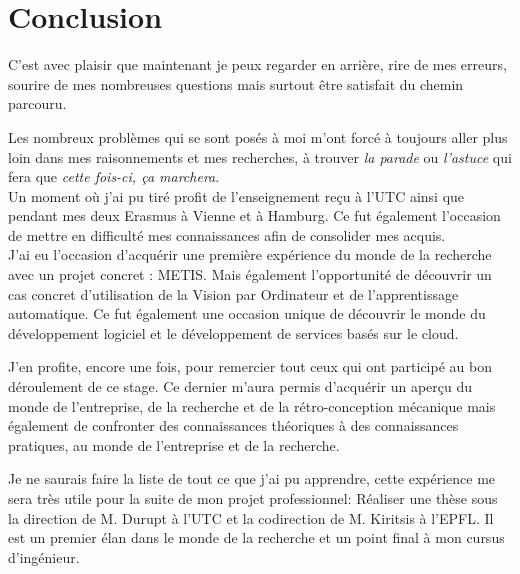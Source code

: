 \chapter{Conclusion}

C'est avec plaisir que maintenant je peux regarder en arrière, rire de mes erreurs, sourire de mes nombreuses questions mais surtout être satisfait du chemin parcouru.

Les nombreux problèmes qui se sont posés à moi m'ont forcé à toujours aller plus loin dans mes raisonnements et mes recherches, à trouver \textit{la parade} ou \textit{l'astuce} qui fera que \textit{cette fois-ci, ça marchera}.\\

Un moment où j'ai pu tiré profit de l'enseignement reçu à l'UTC ainsi que pendant mes deux Erasmus à Vienne et à Hamburg. Ce fut également l'occasion de mettre en difficulté mes connaissances afin de consolider mes acquis.\\

J'ai eu l'occasion d'acquérir une première expérience du monde de la recherche avec un projet concret : METIS. Mais également l'opportunité de découvrir un cas concret d'utilisation de la Vision par Ordinateur et de l'apprentissage automatique. Ce fut également une occasion unique de découvrir le monde du développement logiciel et le développement de services basés sur le cloud.

J'en profite, encore une fois, pour remercier tout ceux qui ont participé au bon déroulement de ce stage. Ce dernier m'aura permis d'acquérir un aperçu du monde de l'entreprise, de la recherche et de la rétro-conception mécanique mais également de confronter des connaissances théoriques à des connaissances pratiques, au monde de l'entreprise et de la recherche.

Je ne saurais faire la liste de tout ce que j'ai pu apprendre, cette expérience me sera très utile pour la suite de mon projet professionnel: Réaliser une thèse sous la direction de M. Durupt à l'UTC et la codirection de M. Kiritsis à l'EPFL. Il est un premier élan dans le monde de la recherche et un point final à mon cursus d'ingénieur.